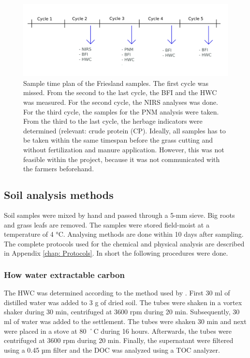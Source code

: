 \documentclass[10pt,twoside,dutch,english]{report}
\begin{document}
\begin{figure}[h] %
	\includegraphics[width=1\linewidth]{mm_samples}
	\caption{Sample time plan of the Friesland samples. The first cycle was missed. From the second to the last cycle, the BFI and the HWC was measured. For the second cycle, the NIRS analyses was done. For the third cycle, the samples for the PNM analysis were taken. From the third to the last cycle, the herbage indicators were determined (relevant: crude protein (CP). Ideally, all samples has to be taken within the same timespan before the grass cutting and without fertilization and manure application. However, this was not feasible within the project, because it was not communicated with the farmers beforehand.}
	\label{fig:mm_samples}
\end{figure}

\subsection{Soil analysis methods}
Soil samples were mixed by hand and passed through a 5-mm sieve. Big roots and grass leafs are removed. The samples were stored field-moist at a temperature of 4 °C. Analysing methods are done within 10 days after sampling. 
The complete protocols used for the chemical and physical analysis are described in Appendix \ref{chap: Protocols}. In short the following procedures were done. 

\subsubsection{How water extractable carbon}
The HWC was determined according to the method used by \citet{Ghani2003}. First 30 ml of distilled water was added to  3 g of dried soil. The tubes were shaken in a vortex shaker during 30 min, centrifuged at 3600 rpm during 20 min. Subsequently, 30 ml of water was added to the settlement. The tubes were shaken 30 min and next were placed in a stove at 80 ˚C during 16 hours. Afterwards, the tubes were centrifuged at 3600 rpm during 20 min. Finally, the supernatant were filtered using a 0.45 µm filter and the DOC was analyzed using a TOC analyzer. 
\end{document}
